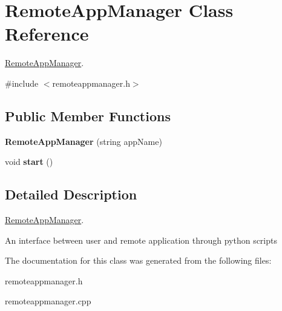 \hypertarget{class_remote_app_manager}{\section{\-Remote\-App\-Manager \-Class \-Reference}
\label{class_remote_app_manager}
}


\hyperlink{class_remote_app_manager}{\-Remote\-App\-Manager}.  




{\ttfamily \#include $<$remoteappmanager.\-h$>$}

\subsection*{\-Public \-Member \-Functions}
\begin{DoxyCompactItemize}
\item 
\hypertarget{class_remote_app_manager_a2bd396df9924392f2440b1517a3789b9}{{\bfseries \-Remote\-App\-Manager} (string app\-Name)}\label{class_remote_app_manager_a2bd396df9924392f2440b1517a3789b9}

\item 
\hypertarget{class_remote_app_manager_a86509c864c2f6ac35b44feeef5e7c852}{void {\bfseries start} ()}\label{class_remote_app_manager_a86509c864c2f6ac35b44feeef5e7c852}

\end{DoxyCompactItemize}


\subsection{\-Detailed \-Description}
\hyperlink{class_remote_app_manager}{\-Remote\-App\-Manager}. 

\-An interface between user and remote application through python scripts 

\-The documentation for this class was generated from the following files\-:\begin{DoxyCompactItemize}
\item 
remoteappmanager.\-h\item 
remoteappmanager.\-cpp\end{DoxyCompactItemize}
